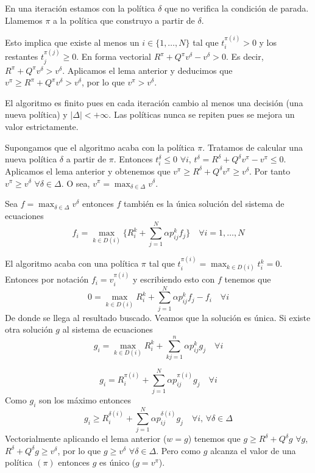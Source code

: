 \documentclass[MIOP.tex]{subfiles}
\begin{document}
\begin{dem}
En una iteración estamos con la política $\delta$ que no verifica la condición de parada. Llamemos $\pi$ a la política que construyo a partir de $\delta$. 

Esto implica que existe al menos un $i\in\{1,\dotsc,N\}$ tal que $t_i^{\pi(i)}>0$ y los restantes $t_j^{\pi(j)}\geq 0$. En forma vectorial $R^\pi+Q^\pi v^\delta - v^\delta > 0$. Es decir, $R^\pi + Q^\pi v^\delta > v^\delta$. Aplicamos el lema anterior y deducimos que $v^\pi \geq R^\pi + Q^\pi v^\delta > v^\delta$, por lo que $v^\pi > v^\delta$.

El algoritmo es finito pues en cada iteración cambio al menos una decisión (una nueva política) y $|\Delta|<+\infty$. Las políticas nunca se repiten pues se mejora un valor estrictamente.

 Supongamos que el algoritmo acaba con la política $\pi$. Tratamos de calcular una nueva política $\delta$ a partir de $\pi$. Entonces $t_i^\delta \leq 0$ $\forall i$, $t^\delta = R^\delta + Q^\delta v^\pi - v^\pi\leq 0$. Aplicamos el lema anterior y obtenemos que $v^\pi \geq R^\delta+Q^\delta v^\pi \geq v^\delta$. Por tanto $v^\pi \geq v^\delta$ $\forall \delta \in \Delta$. O sea, $v^\pi = \max_{\delta \in \Delta}v^\delta$.
\end{dem}
\begin{lemma}
Sea $f=\max_{\delta \in \Delta}v^\delta$ entonces $f$ también es la única solución del sistema de ecuaciones 
$$
f_i = \max_{k\in D(i)}\{R_i^k + \sum_{j=1}^N \alpha p_{ij}^k f_j\} \quad \forall i = 1, \dotsc, N
$$
\end{lemma}
\begin{dem}
El algoritmo acaba con una política $\pi$ tal que $t_i^{\pi(i)} = \max_{k\in D(i)} t_i^k = 0$. Entonces por notación $f_i = v_i^{\pi(i)}$ y escribiendo esto con $f$ tenemos que 
$$
0 = \max_{k\in D(i)} R_i^k + \sum_{j=1}^N \alpha p_{ij}^k f_j - f_i \quad  \forall i$$
De donde se llega al resultado buscado. Veamos que la solución es única. Si existe otra solución $g$ al sistema de ecuaciones
$$
g_i = \max_{k\in D(i)} R^k_i + \sum_{kj=1}^n \alpha p_{ij}^k g_j \quad \forall i$$

$$g_i = R_i^{\pi(i)}+\sum_{j=1}^N \alpha p_{ij}^{\pi(i)}g_j \quad \forall i$$
Como $g_i$ son los máximo entonces 
$$g_i \geq R_i^{\delta(i)}+\sum_{j=1}^N \alpha p_{ij}^{\delta(i)}g_j \quad \forall i,\,\forall \delta \in \Delta$$
Vectorialmente aplicando el lema anterior ($w=g$) tenemos que $g\geq R^\delta+Q^\delta g$ $\forall g$, $R^\delta+Q^\delta g\geq v^\delta$, por lo que $g\geq v^\delta$ $\forall \delta \in \Delta$. Pero como $g$ alcanza el valor de una política $(\pi)$ entonces $g$ es único ($g=v^\pi$).
\end{dem}
\end{document}
